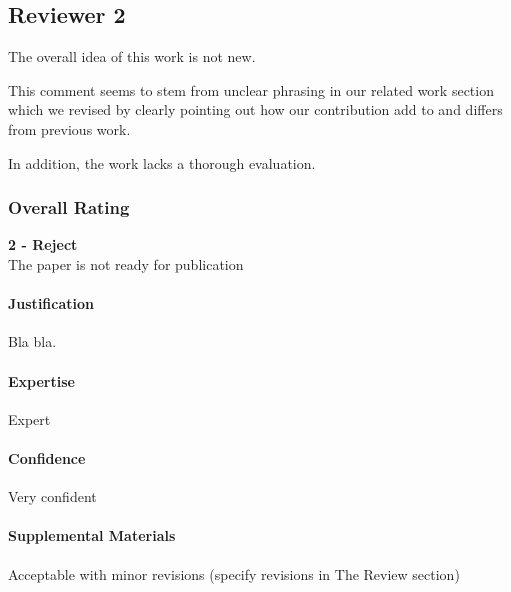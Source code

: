 \subsection{Reviewer 2} \label{sec:rev:2}

The overall idea of this work is not new. 

\begin{response} \label{res:rev2:related}
This comment seems to stem from unclear phrasing in our related work section which we revised by clearly pointing out how our contribution add to and differs from previous work. 
\end{response}

In addition, the work lacks a thorough evaluation.

\subsubsection*{Overall Rating}
\textbf{2 - Reject} \\
The paper is not ready for publication

\paragraph{Justification}
Bla bla.

\paragraph{Expertise}
Expert

\paragraph{Confidence}
Very confident

\paragraph{Supplemental Materials}
Acceptable with minor revisions (specify revisions in The Review section)

